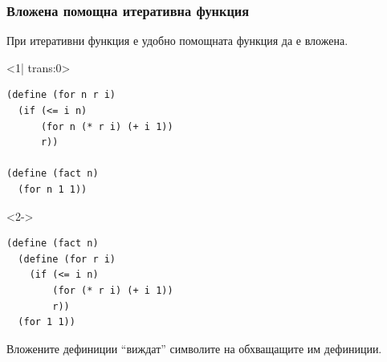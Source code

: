 \documentclass[alsotrans]{beamerswitch}
\begin{document}
\begin{frame}[fragile]
  \frametitle{Вложена помощна итеративна функция}

  При итеративни функция е удобно помощната функция да е вложена.
  \begin{overlayarea}{\textwidth}{.5\textheight}
    \begin{onlyenv}<1| trans:0>
\begin{lstlisting}
(define (for n r i)
  (if (<= i n)
      (for n (* r i) (+ i 1))
      r))

(define (fact n)
  (for n 1 1))
\end{lstlisting}
    \end{onlyenv}
    \begin{onlyenv}<2->
\begin{lstlisting}
(define (fact n)
  (define (for r i)
    (if (<= i n)
        (for (* r i) (+ i 1))
        r))
  (for 1 1))
\end{lstlisting}
    \end{onlyenv}
  \end{overlayarea}
  Вложените дефиниции ``виждат'' символите на обхващащите им дефиниции.
\end{frame}
\end{document}
